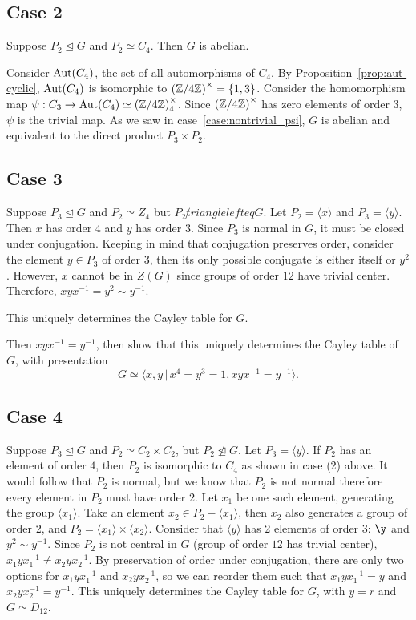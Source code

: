 \subsection*{Case 2} Suppose $P_2 \trianglelefteq G$ and $P_2 \simeq C_4$.
Then $G$ is abelian.

Consider $\operatorname{Aut}(C_4)$, the set of all automorphisms of $C_4$.
By Proposition~\ref{prop:aut-cyclic}, $\operatorname{Aut}(C_4)$ is isomorphic to
${(\mathbb{Z}/4\mathbb{Z})}^\times = \{ 1, 3 \}$.
Consider the homomorphism map $\psi : C_3 \to \operatorname{Aut}(C_4) \simeq {(\mathbb{Z}/4\mathbb{Z})}_4^\times$.
Since ${(\mathbb{Z}/4\mathbb{Z})}^\times$ has zero elements of order $3$,
$\psi$ is the trivial map. As we saw in case~\ref{case:nontrivial_psi},
$G$ is abelian and equivalent to the direct product $P_3 \times P_2$.

\subsection*{Case 3} Suppose $P_3 \trianglelefteq G$ and $P_2 \simeq Z_4$
but $P_2 \not trianglelefteq G$.
Let $P_2=\langle x \rangle$ and $P_3=\langle y \rangle$.
Then $x$ has order $4$ and $y$ has order $3$.
Since $P_3$ is normal in $G$, it must be closed under conjugation.
Keeping in mind that conjugation preserves order,
consider the element $y \in P_3$ of order $3$,
then its only possible conjugate is either itself or $y^2$.
However, $x$ cannot be in $Z(G)$ since groups of order $12$
have trivial center. Therefore, $xyx^{-1} = y^2 \sim y^{-1}$.

This uniquely determines the Cayley table for $G$.


Then $xyx^{-1}=y^{-1}$, then show that this uniquely determines the Cayley 
table of $G$, with presentation
\[ G \simeq \langle x,y \,|\, x^4=y^3=1, xyx^{-1}=y^{-1} \rangle. \]

\subsection*{Case 4} Suppose $P_3 \trianglelefteq G$ and 
$P_2 \simeq C_2 \times C_2$, but $P_2 \not\trianglelefteq G$.
Let $P_3 = \langle y \rangle$.
If $P_2$ has an element of order $4$, then $P_2$ is isomorphic to
$C_4$ as shown in case (2) above. It would follow that $P_2$ is normal,
but we know that $P_2$ is not normal therefore every element in $P_2$
must have order $2$.
Let $x_1$ be one such element, generating the group $\langle x_1 \rangle$.
Take an element $x_2 \in P_2 - \langle x_1 \rangle$,
then $x_2$ also generates a group of order $2$,
and $P_2 = \langle x_1 \rangle \times \langle x_2 \rangle$.
Consider that $\langle y \rangle$ has 2 elements of order $3$:
$\y$ and $y^2 \sim y^{-1}$.
Since $P_2$ is not central in $G$ (group of order $12$ has trivial center),
$x_1 yx_1^{-1} \neq x_2 yx_2^{-1}$. By preservation of order under conjugation,
there are only two options for $x_1 yx_1^{-1}$ and $x_2 yx_2^{-1}$,
so we can reorder them such that $x_1 y x_1 ^{-1} = y$ and $x_2 y x_2^{-1} = y^{-1}$.
This uniquely determines the Cayley table for $G$,
with $y = r$ and $G \simeq D_{12}$.
